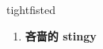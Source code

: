 
\begin{frame}
{\huge tightfisted}
\begin{center}
\begin{enumerate}\Large
  \item \textbf{吝啬的 stingy}
\end{enumerate}
\end{center}
\end{frame}
